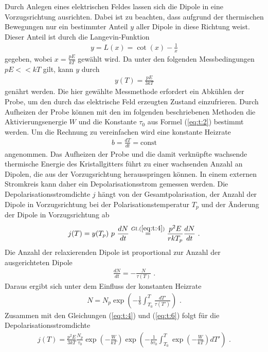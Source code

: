 \noindent
Durch Anlegen eines elektrischen Feldes lassen sich die Dipole in eine Vorzugsrichtung ausrichten.
Dabei ist zu beachten, dass aufgrund der thermischen Bewegungen nur ein bestimmter Anteil $y$ aller Dipole in diese Richtung weist.
Dieser Anteil ist durch die Langevin-Funktion 
\begin{align}
y=L(x)=\cot (x) -\frac{1}{x}
\label{eq:t:3}
\end{align}
gegeben, wobei $x=\frac{pE}{kT}$ gewählt wird.
Da unter den folgenden Messbedingungen $pE<<kT$ gilt, kann $y$ durch
\begin{align}
y(T)=\frac{pE}{3kT}
\label{eq:t:4}
\end{align}
genährt werden.
Die hier gewählte Messmethode erfordert ein Abkühlen der Probe, um den durch das elektrische Feld erzeugten Zustand einzufrieren.
Durch Aufheizen der Probe können mit den im folgenden beschriebenen Methoden die Aktivierungsenergie $W$ und die Konstante $\tau_0$ aus Formel (\ref{eq:t:2}) bestimmt werden. 
Um die Rechnung zu vereinfachen wird eine konstante Heizrate
\begin{align}
b=\frac{dT}{dt}=\text{const}
\label{eq:t:5}
\end{align}
angenommen.
Das Aufheizen der Probe und die damit verknüpfte wachsende thermische Energie des Kristallgitters führt zu einer wachsenden Anzahl an Dipolen, die aus der Vorzugsrichtung herausspringen können.
In einem externen Stromkreis kann daher ein Depolarisationsstrom gemessen werden. 
Die Depolarisationsstromdichte $j$ hängt von der Gesamtpolarisation, der Anzahl der Dipole in Vorzugsrichtung bei der Polarisationstemperatur $T_p$ und der Änderung der Dipole in Vorzugsrichtung ab
\begin{align}
j(T)=y(T_p)~p~\frac{dN}{dt} \overset{Gl. (\ref{eq:t:4})}{=} \frac{p^2E}{rkT_p}\frac{dN}{dt}\text{ .}
\label{eq:t:6}
\end{align}
Die Anzahl der relaxierenden Dipole ist proportional zur Anzahl der ausgerichteten Dipole
\begin{align}
\frac{dN}{dt}=-\frac{N}{\tau(T)} \text{ .}
\label{eq:t:7}
\end{align}
Daraus ergibt sich unter dem Einfluss der konstanten Heizrate
\begin{align}
N=N_p\exp \left(-\frac{1}{b} \int_{T_0}^T \frac{dT\prime}{\tau(T\prime)}\right) \text{ .}
\label{eq:t:8}
\end{align}
Zusammen mit den Gleichungen (\ref{eq:t:4}) und (\ref{eq:t:6}) folgt für die Depolarisationsstromdichte
\begin{align}
j(T)=\frac{p^2E}{3kT}\frac{N_p}{\tau_0}\exp \left(-\frac{W}{kT}\right)\exp\left(-\frac{1}{b\tau_0}\int_{T_0}^T\exp\left(-\frac{W}{kT}\right)dT\prime\right) \text{ .}
\label{eq:t:9}
\end{align}
